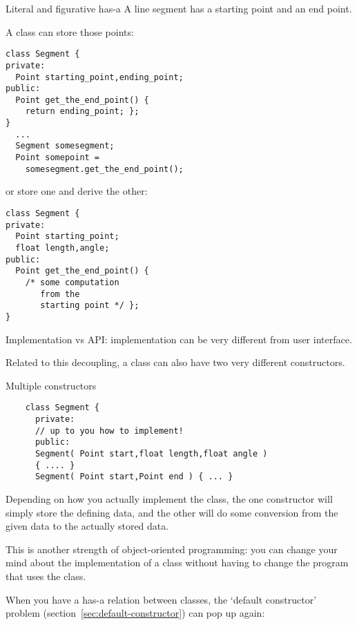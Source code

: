 \begin{slide}{Literal and figurative has-a}
  \label{sl:obj-hasa-ish}
\small
  A line segment has a starting point and an end point.
\begin{multicols}{2}
  A 
  class can store those points:
\begin{lstlisting}
class Segment {
private:
  Point starting_point,ending_point;
public:
  Point get_the_end_point() {
    return ending_point; };
}
  ...
  Segment somesegment;
  Point somepoint =
    somesegment.get_the_end_point();
\end{lstlisting}
\columnbreak
or store one and derive the other:
\begin{lstlisting}
class Segment {
private:
  Point starting_point;
  float length,angle;
public:
  Point get_the_end_point() {
    /* some computation
       from the
       starting point */ };
}
\end{lstlisting}
\vfill\hbox{}
\end{multicols}
Implementation vs API: implementation can be very different from user interface.
\end{slide}

Related to this decoupling, a class can also have two very different constructors.
\begin{block}{Multiple constructors}
  \label{sl:segment-constructors}
  \begin{lstlisting}
    class Segment {
      private:
      // up to you how to implement!
      public:
      Segment( Point start,float length,float angle )
      { .... }
      Segment( Point start,Point end ) { ... }
  \end{lstlisting}
  Depending on how you actually implement the class, the one constructor
  will simply store the defining data, and the other will do some
  conversion from the given data to the actually stored data.
\end{block}

This is another strength of object-oriented programming: you can
change your mind about the implementation of a class without having
to change the program that uses the class.

When you have a has-a relation between classes, the `default
constructor' problem (section~\ref{sec:default-constructor}) can pop
up again:

